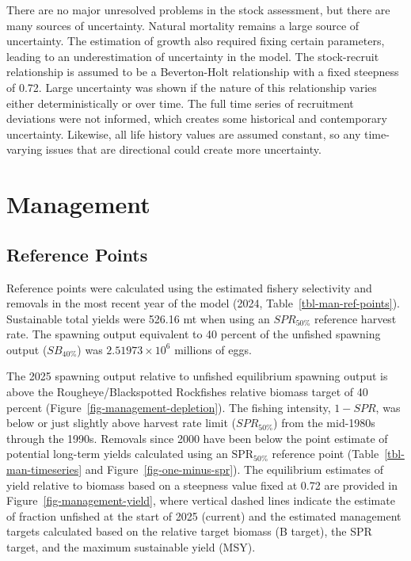 \documentclass[
]{scrartcl}
\begin{document}
There are no major unresolved problems in the stock assessment, but
there are many sources of uncertainty. Natural mortality remains a large
source of uncertainty. The estimation of growth also required fixing
certain parameters, leading to an underestimation of uncertainty in the
model. The stock-recruit relationship is assumed to be a Beverton-Holt
relationship with a fixed steepness of 0.72. Large uncertainty was shown
if the nature of this relationship varies either deterministically or
over time. The full time series of recruitment deviations were not
informed, which creates some historical and contemporary uncertainty.
Likewise, all life history values are assumed constant, so any
time-varying issues that are directional could create more uncertainty.

\newpage{}

\section{Management}\label{management}

\subsection{Reference Points}\label{reference-points-1}

Reference points were calculated using the estimated fishery selectivity
and removals in the most recent year of the model (2024,
Table~\ref{tbl-man-ref-points}). Sustainable total yields were 526.16 mt
when using an \(SPR_{50\%}\) reference harvest rate. The spawning output
equivalent to 40 percent of the unfished spawning output (\(SB_{40\%}\))
was \ensuremath{2.51973\times 10^{6}} millions of eggs.

The 2025 spawning output relative to unfished equilibrium spawning
output is above the Rougheye/Blackspotted Rockfishes relative biomass
target of 40 percent (Figure~\ref{fig-management-depletion}). The
fishing intensity, \(1-SPR\), was below or just slightly above harvest
rate limit (\(SPR_{50\%}\)) from the mid-1980s through the 1990s.
Removals since 2000 have been below the point estimate of potential
long-term yields calculated using an \(\text{SPR}_{50\%}\) reference
point (Table~\ref{tbl-man-timeseries} and
Figure~\ref{fig-one-minus-spr}). The equilibrium estimates of yield
relative to biomass based on a steepness value fixed at 0.72 are
provided in Figure~\ref{fig-management-yield}, where vertical dashed
lines indicate the estimate of fraction unfished at the start of 2025
(current) and the estimated management targets calculated based on the
relative target biomass (B target), the SPR target, and the maximum
sustainable yield (MSY).
\end{document}
